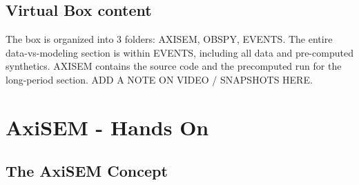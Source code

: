 \documentclass{article}
\begin{document}
\subsection{Virtual Box content}
The box is organized into 3 folders: AXISEM, OBSPY, EVENTS. The entire
data-vs-modeling section is within EVENTS, including all data and pre-computed
synthetics. AXISEM contains the source code and the precomputed run
for the long-period section. ADD A NOTE ON VIDEO / SNAPSHOTS HERE.


\newpage

\section{AxiSEM - Hands On}

\subsection{The AxiSEM Concept}
\end{document}
